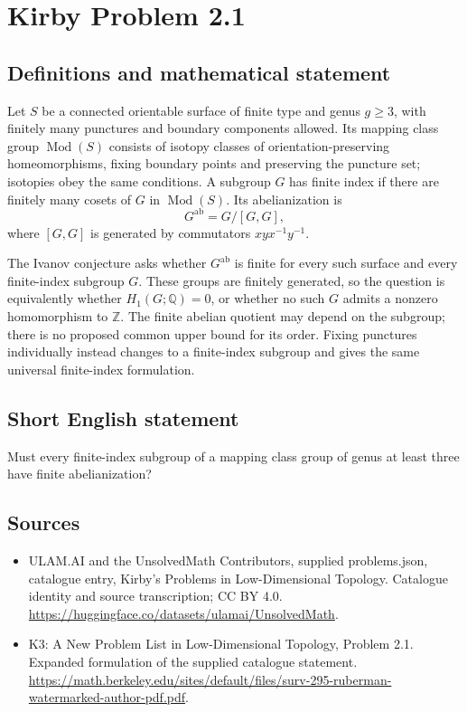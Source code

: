 \documentclass[11pt,a4paper]{article}
\begin{document}
\section*{Kirby Problem 2.1}\label{statement}

\subsection{Definitions and mathematical statement}
Let $S$ be a connected orientable surface of finite type and genus $g\geq3$,
with finitely many punctures and boundary components allowed.
Its mapping class group $\operatorname{Mod}(S)$ consists of isotopy classes of
orientation-preserving homeomorphisms, fixing boundary points and preserving
the puncture set; isotopies obey the same conditions.
A subgroup $G$ has finite index if there are finitely many cosets of $G$ in
$\operatorname{Mod}(S)$. Its abelianization is
\[
G^{\mathrm{ab}}=G/[G,G],
\]
where $[G,G]$ is generated by commutators $xyx^{-1}y^{-1}$.

The Ivanov conjecture asks whether $G^{\mathrm{ab}}$ is finite for every such
surface and every finite-index subgroup $G$.
These groups are finitely generated, so the question is equivalently whether
$H_1(G;\mathbb Q)=0$, or whether no such $G$ admits a nonzero homomorphism to
$\mathbb Z$. The finite abelian quotient may depend on the subgroup; there is
no proposed common upper bound for its order. Fixing punctures individually
instead changes to a finite-index subgroup and gives the same universal
finite-index formulation.
\subsection{Short English statement}
Must every finite-index subgroup of a mapping class group of genus at least three have finite abelianization?
\subsection{Sources}
\begin{itemize}
\item[S1] ULAM.AI and the UnsolvedMath Contributors, supplied problems.json, catalogue entry, Kirby's Problems in Low-Dimensional Topology. Catalogue identity and source transcription; CC BY 4.0.
\url{https://huggingface.co/datasets/ulamai/UnsolvedMath}.
\item[S2] K3: A New Problem List in Low-Dimensional Topology, Problem 2.1. Expanded formulation of the supplied catalogue statement.
\url{https://math.berkeley.edu/sites/default/files/surv-295-ruberman-watermarked-author-pdf.pdf}.
\end{itemize}
\end{document}
